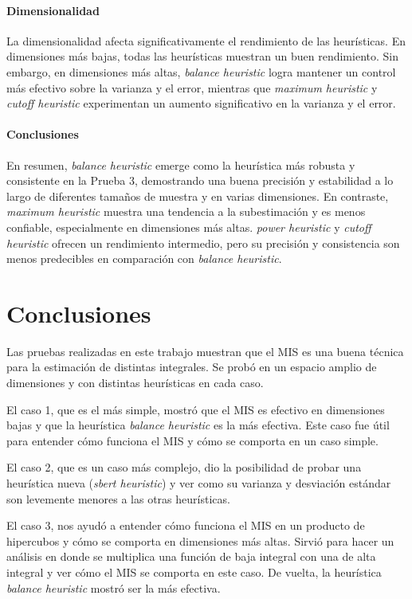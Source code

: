 \documentclass{article}
\begin{document}
\paragraph{Dimensionalidad}
La dimensionalidad afecta significativamente el rendimiento de las heurísticas. En dimensiones más bajas, todas las heurísticas muestran un buen rendimiento. Sin embargo, en dimensiones más altas, \textit{balance heuristic} logra mantener un control más efectivo sobre la varianza y el error, mientras que \textit{maximum heuristic} y \textit{cutoff heuristic} experimentan un aumento significativo en la varianza y el error.

\paragraph{Conclusiones}
En resumen, \textit{balance heuristic} emerge como la heurística más robusta y consistente en la Prueba 3, demostrando una buena precisión y estabilidad a lo largo de diferentes tamaños de muestra y en varias dimensiones. En contraste, \textit{maximum heuristic} muestra una tendencia a la subestimación y es menos confiable, especialmente en dimensiones más altas. \textit{power heuristic} y \textit{cutoff heuristic} ofrecen un rendimiento intermedio, pero su precisión y consistencia son menos predecibles en comparación con \textit{balance heuristic}.

\section{Conclusiones}

Las pruebas realizadas en este trabajo muestran que el MIS es una buena técnica para la estimación de distintas integrales.
Se probó en un espacio amplio de dimensiones y con distintas heurísticas en cada caso.

El caso 1, que es el más simple, mostró que el MIS es efectivo en dimensiones bajas y que la heurística \textit{balance heuristic} es la más efectiva.
Este caso fue útil para entender cómo funciona el MIS y cómo se comporta en un caso simple.

El caso 2, que es un caso más complejo, dio la posibilidad de probar una heurística nueva (\textit{sbert heuristic}) y ver como su varianza y desviación estándar son levemente menores a las otras heurísticas.

El caso 3, nos ayudó a entender cómo funciona el MIS en un producto de hipercubos y cómo se comporta en dimensiones más altas.
Sirvió para hacer un análisis en donde se multiplica una función de baja integral con una de alta integral y ver cómo el MIS se comporta en este caso.
De vuelta, la heurística \textit{balance heuristic} mostró ser la más efectiva.
\end{document}
